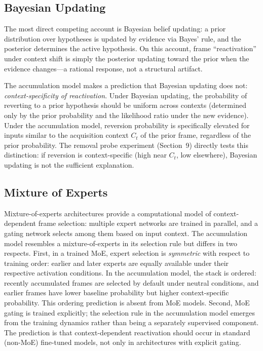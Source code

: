\documentclass[12pt]{article}
\begin{document}
\subsection{Bayesian Updating}

The most direct competing account is Bayesian belief updating:
a prior distribution over hypotheses is updated by evidence via
Bayes' rule, and the posterior determines the active hypothesis.
On this account, frame ``reactivation'' under context shift is
simply the posterior updating toward the prior when the evidence
changes---a rational response, not a structural artifact.

The accumulation model makes a prediction that Bayesian updating
does not: \emph{context-specificity of reactivation}.
Under Bayesian updating, the probability of reverting to a prior
hypothesis should be uniform across contexts (determined only by
the prior probability and the likelihood ratio under the new
evidence).
Under the accumulation model, reversion probability is specifically
elevated for inputs similar to the acquisition context $C_t$ of
the prior frame, regardless of the prior probability.
The removal probe experiment (Section~9) directly tests this
distinction: if reversion is context-specific (high near $C_t$,
low elsewhere), Bayesian updating is not the sufficient explanation.

\subsection{Mixture of Experts}

Mixture-of-experts architectures \cite{jacobs1991} provide a
computational model of context-dependent frame selection:
multiple expert networks are trained in parallel, and a gating
network selects among them based on input context.
The accumulation model resembles a mixture-of-experts in its
selection rule but differs in two respects.
First, in a trained MoE, expert selection is \emph{symmetric}
with respect to training order: earlier and later experts are
equally available under their respective activation conditions.
In the accumulation model, the stack is ordered: recently
accumulated frames are selected by default under neutral conditions,
and earlier frames have lower baseline probability but higher
context-specific probability.
This ordering prediction is absent from MoE models.
Second, MoE gating is trained explicitly; the selection rule in
the accumulation model emerges from the training dynamics rather
than being a separately supervised component.
The prediction is that context-dependent reactivation should occur
in standard (non-MoE) fine-tuned models, not only in architectures
with explicit gating.
\end{document}
